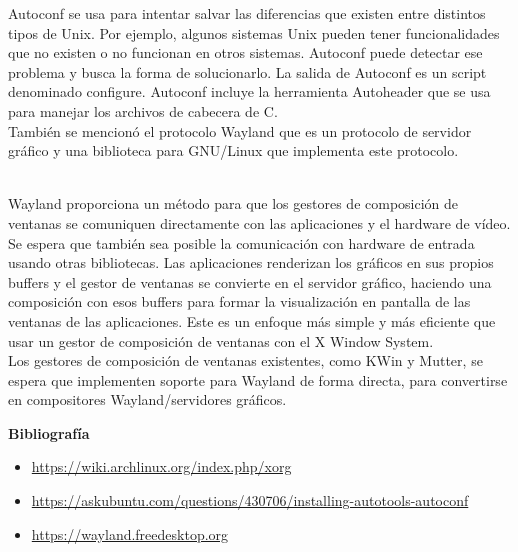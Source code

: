 \documentclass[11pt, a4paper]{report}
\begin{document}
Autoconf se usa para intentar salvar las diferencias que existen entre
distintos tipos de Unix. Por ejemplo, algunos sistemas Unix pueden tener
funcionalidades que no existen o no funcionan en otros sistemas. Autoconf puede
detectar ese problema y busca la forma de solucionarlo. La salida de Autoconf
es un script denominado configure. Autoconf incluye la herramienta Autoheader
que se usa para manejar los archivos de cabecera de C. \\

También se mencionó el protocolo Wayland que es un protocolo de servidor
gráfico y una biblioteca para GNU/Linux que implementa este protocolo. \\​

Wayland proporciona un método para que los gestores de composición de ventanas
se comuniquen directamente con las aplicaciones y el hardware de vídeo. Se
espera que también sea posible la comunicación con hardware de entrada usando
otras bibliotecas. Las aplicaciones renderizan los gráficos en sus propios
buffers y el gestor de ventanas se convierte en el servidor gráfico, haciendo
una composición con esos buffers para formar la visualización en pantalla de
las ventanas de las aplicaciones. Este es un enfoque más simple y más eficiente
que usar un gestor de composición de ventanas con el X Window System. \\

Los gestores de composición de ventanas existentes, como KWin y Mutter, se
espera que implementen soporte para Wayland de forma directa, para convertirse
en compositores Wayland/servidores gráficos.

\newpage

\textbf{Bibliografía} \\

\begin{itemize}

\item  \url{https://wiki.archlinux.org/index.php/xorg}
\item  \url{https://askubuntu.com/questions/430706/installing-autotools-autoconf}  
\item  \url{https://wayland.freedesktop.org}
\end{itemize}
\end{document}
